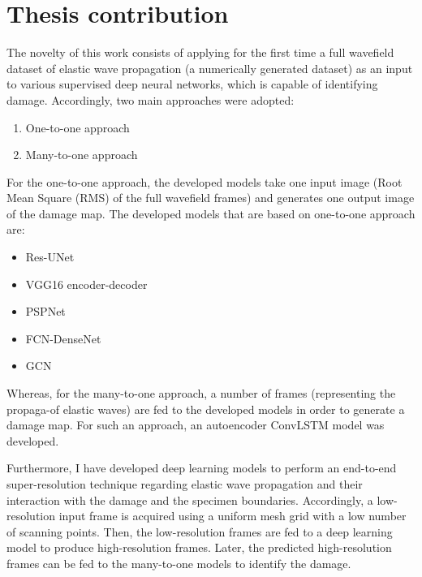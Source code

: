 \section{Thesis contribution}
\label{sec14}
The novelty of this work consists of applying for the first time a full wavefield dataset of elastic wave propagation (a numerically generated dataset) as an input to various supervised deep neural networks, which is capable of identifying damage.
Accordingly, two main approaches were adopted:
\begin{enumerate}
	\item One-to-one approach
	\item Many-to-one approach
\end{enumerate}

For the one-to-one approach, the developed models take one input image (Root Mean Square (RMS) of the full wavefield frames) and generates one output image of the damage map. 
The developed models that are based on one-to-one approach are:
\begin{itemize}
	\item Res-UNet
	\item VGG16 encoder-decoder
	\item PSPNet
	\item FCN-DenseNet
	\item GCN
\end{itemize}
Whereas, for the many-to-one approach, a number of frames (representing the propaga-\tion of elastic waves) are fed to the developed models in order to generate a damage map.
For such an approach, an autoencoder ConvLSTM model was developed.

Furthermore, I have developed deep learning models to perform an end-to-end super-resolution technique regarding elastic wave propagation and their interaction with the damage and the specimen boundaries.
Accordingly, a low-resolution input frame is acquired using a uniform mesh grid with a low number of scanning points.
Then, the low-resolution frames are fed to a deep learning model to produce high-resolution frames.
Later, the predicted high-resolution frames can be fed to the many-to-one models to identify the damage.